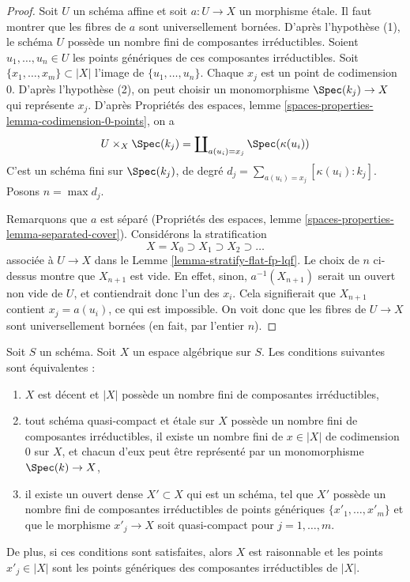 \begin{proof}
Soit $U$ un schéma affine et soit $a : U \to X$ un morphisme étale.
Il faut montrer que les fibres de $a$ sont universellement bornées. D'après
l'hypothèse (1), le schéma $U$ possède un nombre fini de composantes
irréductibles. Soient $u_1, \ldots, u_n \in U$ les points génériques de ces
composantes irréductibles. Soit $\{x_1, \ldots, x_m\} \subset |X|$ l'image de
$\{u_1, \ldots, u_n\}$. Chaque $x_j$ est un point de codimension $0$.
D'après l'hypothèse (2), on peut choisir un monomorphisme
$\Spec(k_j) \to X$ qui représente $x_j$. D'après Propriétés des espaces, lemme
\ref{spaces-properties-lemma-codimension-0-points}, on a
$$
U \times_X \Spec(k_j) = \coprod\nolimits_{a(u_i) = x_j} \Spec(\kappa(u_i))
$$
C'est un schéma fini sur $\Spec(k_j)$, de degré
$d_j = \sum_{a(u_i) = x_j} [\kappa(u_i) : k_j]$. Posons $n = \max d_j$.

\medskip\noindent
Remarquons que $a$ est séparé
(Propriétés des espaces, lemme
\ref{spaces-properties-lemma-separated-cover}).
Considérons la stratification
$$
X = X_0 \supset X_1 \supset X_2 \supset \ldots
$$
associée à $U \to X$ dans le Lemme \ref{lemma-stratify-flat-fp-lqf}.
Le choix de $n$ ci-dessus montre que $X_{n + 1}$ est vide.
En effet, sinon, $a^{-1}(X_{n + 1})$ serait un ouvert non vide de $U$, et
contiendrait donc l'un des $x_i$. Cela signifierait que $X_{n + 1}$ contient
$x_j = a(u_i)$, ce qui est impossible.
On voit donc que les fibres de $U \to X$ sont universellement bornées
(en fait, par l'entier $n$).
\end{proof}

\begin{lemma}
\label{lemma-finitely-many-irreducible-components}
Soit $S$ un schéma. Soit $X$ un espace algébrique sur $S$.
Les conditions suivantes sont équivalentes :
\begin{enumerate}
\item $X$ est décent et $|X|$ possède un nombre fini de composantes
irréductibles,
\item tout schéma quasi-compact et étale sur $X$ possède un nombre fini de
composantes irréductibles, il existe un nombre fini de $x \in |X|$ de
codimension $0$ sur $X$, et chacun d'eux peut être représenté par un
monomorphisme $\Spec(k) \to X$,
\item il existe un ouvert dense $X' \subset X$ qui est un schéma, tel que
$X'$ possède un nombre fini de composantes irréductibles de points génériques
$\{x'_1, \ldots, x'_m\}$ et que le morphisme $x'_j \to X$ soit quasi-compact
pour $j = 1, \ldots, m$.
\end{enumerate}
De plus, si ces conditions sont satisfaites, alors $X$ est raisonnable et les
points $x'_j \in |X|$ sont les points génériques des composantes irréductibles
de $|X|$.
\end{lemma}

